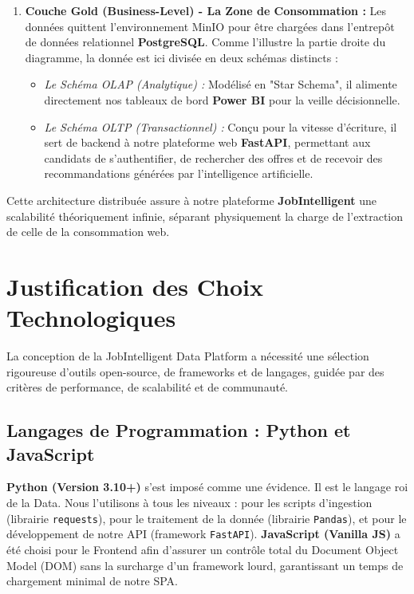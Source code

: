 \documentclass[12pt,a4paper,twoside]{report}
\begin{document}
\begin{enumerate}
    \item \textbf{Couche Gold (Business-Level) - La Zone de Consommation :} Les données quittent l'environnement MinIO pour être chargées dans l'entrepôt de données relationnel \textbf{PostgreSQL}. Comme l'illustre la partie droite du diagramme, la donnée est ici divisée en deux schémas distincts :
    \begin{itemize}
        \item \textit{Le Schéma OLAP (Analytique) :} Modélisé en "Star Schema", il alimente directement nos tableaux de bord \textbf{Power BI} pour la veille décisionnelle.
        \item \textit{Le Schéma OLTP (Transactionnel) :} Conçu pour la vitesse d'écriture, il sert de backend à notre plateforme web \textbf{FastAPI}, permettant aux candidats de s'authentifier, de rechercher des offres et de recevoir des recommandations générées par l'intelligence artificielle.
    \end{itemize}
\end{enumerate}

Cette architecture distribuée assure à notre plateforme \textbf{JobIntelligent} une scalabilité théoriquement infinie, séparant physiquement la charge de l'extraction de celle de la consommation web.

\section{Justification des Choix Technologiques}

La conception de la JobIntelligent Data Platform a nécessité une sélection rigoureuse d'outils open-source, de frameworks et de langages, guidée par des critères de performance, de scalabilité et de communauté.

\subsection{Langages de Programmation : Python et JavaScript}
\textbf{Python (Version 3.10+)} s'est imposé comme une évidence. Il est le langage roi de la Data. Nous l'utilisons à tous les niveaux : pour les scripts d'ingestion (librairie \texttt{requests}), pour le traitement de la donnée (librairie \texttt{Pandas}), et pour le développement de notre API (framework \texttt{FastAPI}).
\textbf{JavaScript (Vanilla JS)} a été choisi pour le Frontend afin d'assurer un contrôle total du Document Object Model (DOM) sans la surcharge d'un framework lourd, garantissant un temps de chargement minimal de notre SPA.
\end{document}
